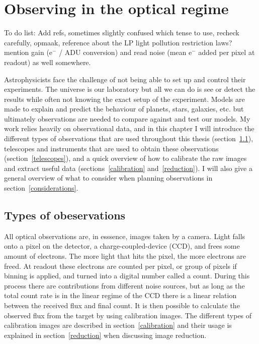 \documentclass[a4paper,oneside,12pt, class=Latex/Classes/PhDthesisPSnPDF, crop=false]{standalone}
\begin{document}
\doublespacing
\chapter{Observing in the optical regime}
\label{chap:obs}

\color{red}To do list: Add refs, sometimes slightly confused which tense to use, recheck carefully, opmaak, reference about the LP light pollution restriction laws? mention gain (e$^-$ / ADU conversion) and read noise (mean e$^-$ added per pixel at readout) as well somewhere. \color{black}

Astrophysicists face the challenge of not being able to set up and control their experiments. The universe is our laboratory but all we can do is see or detect the results while often not knowing the exact setup of the experiment. Models are made to explain and predict the behaviour of planets, stars, galaxies, etc. but ultimately observations are needed to compare against and test our models. My work relies heavily on observational data, and in this chapter I will introduce the different types of observations that are used throughout this thesis (section~\ref{observation_types}), telescopes and instruments that are used to obtain these observations (section~\ref{telescopes}), and a quick overview of how to calibrate the raw images and extract useful data (sections~\ref{calibration} and~\ref{reduction}). I will also give a general overview of what to consider when planning observations in section~\ref{considerations}.


\section{Types of obeservations}
\label{observation_types}
All optical observations are, in esssence, images taken by a camera. Light falls onto a pixel on the detector, a charge-coupled-device (CCD), and frees some amount of electrons. The more light that hits the pixel, the more electrons are freed. At readout these electrons are counted per pixel, or group of pixels if binning is applied, and turned into a digital number called a count. During this process there are contributions from different noise sources, but as long as the total count rate is in the linear regime of the CCD there is a linear relation between the received flux and final count. It is then possible to calculate the observed flux from the target by using calibration images. The different types of calibration images are described in section~\ref{calibration} and their usage is explained in section~\ref{reduction} when discussing image reduction.
\end{document}
